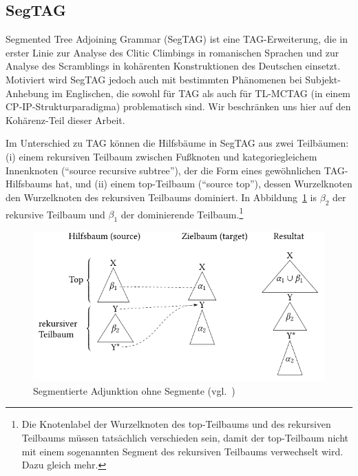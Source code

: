\subsection{SegTAG}
 
Segmented Tree Adjoining Grammar (SegTAG) ist eine TAG-Erweiterung, die \cite{Kulick:00} in erster Linie zur Analyse des Clitic Climbings in romanischen Sprachen und zur Analyse des Scramblings in kohärenten Konstruktionen des Deutschen einsetzt. Motiviert wird SegTAG jedoch auch mit bestimmten Phänomenen bei Subjekt-Anhebung im Englischen, die sowohl für TAG als auch für TL-MCTAG (in einem CP-IP-Strukturparadigma) problematisch sind. Wir beschränken uns hier auf den Kohärenz-Teil dieser Arbeit.

Im Unterschied zu TAG können die Hilfsbäume in SegTAG aus zwei Teilbäumen: (i) einem rekursiven Teilbaum zwischen Fuß\-knoten und kategoriegleichem Innenknoten ("`source recursive subtree"'), der die Form eines gewöhnlichen TAG-Hilfs\-baums hat, und (ii) einem top-Teilbaum ("`source top"'), dessen Wurzelknoten den Wurzelknoten des rekursiven Teilbaums dominiert. In Abbildung~\ref{fig-segmented-adj} is $\beta_2$ der rekursive Teilbaum und $\beta_1$ der dominierende Teilbaum.\footnote{Die Knotenlabel der Wurzelknoten des top-Teilbaums und des rekursiven Teilbaums müssen tatsächlich verschieden sein, damit der top-Teilbaum nicht mit einem sogenannten Segment des rekursiven Teilbaums verwechselt wird. Dazu gleich mehr.}\largerpage%

\begin{figure}[t]
\centering
\includegraphics{graphics/abb611.pdf}
\caption{Segmentierte Adjunktion ohne Segmente (vgl.\ \citealt[Fig.~6.1]{Kulick:00})\label{fig-segmented-adj}}
\end{figure}

